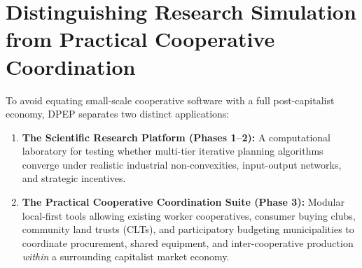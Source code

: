 \documentclass[10pt,twoside,openany]{book}
\theoremstyle{dpepstyle}
\begin{document}
\section{Distinguishing Research Simulation from Practical Cooperative Coordination}

To avoid equating small-scale cooperative software with a full post-capitalist economy, DPEP separates two distinct applications:
\begin{enumerate}[leftmargin=1.8em,itemsep=2pt]
  \item \textbf{The Scientific Research Platform (Phases 1--2):} A computational laboratory for testing whether multi-tier iterative planning algorithms converge under realistic industrial non-convexities, input-output networks, and strategic incentives.
  \item \textbf{The Practical Cooperative Coordination Suite (Phase 3):} Modular local-first tools allowing existing worker cooperatives, consumer buying clubs, community land trusts (CLTs), and participatory budgeting municipalities to coordinate procurement, shared equipment, and inter-cooperative production \emph{within} a surrounding capitalist market economy.
\end{enumerate}
\end{document}
